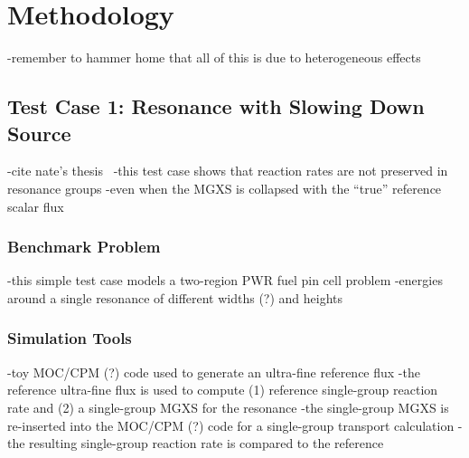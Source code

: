 \section{Methodology}
\label{sec:methodology}

-remember to hammer home that all of this is due to heterogeneous effects


\subsection{Test Case 1: Resonance with Slowing Down Source}
\label{subsec:test-case1}

-cite nate's thesis~\cite{gibson2016thesis}
-this test case shows that reaction rates are not preserved in resonance groups
  -even when the MGXS is collapsed with the ``true'' reference scalar flux

\subsubsection{Benchmark Problem}
\label{subsubsec:benchmark-case1}

-this simple test case models a two-region PWR fuel pin cell problem
-energies around a single resonance of different widths (?) and heights

\subsubsection{Simulation Tools}
\label{subsubsec:sim-tools-case1}

-toy MOC/CPM (?) code used to generate an ultra-fine reference flux
-the reference ultra-fine flux is used to compute (1) reference single-group reaction rate and (2) a single-group MGXS for the resonance
-the single-group MGXS is re-inserted into the MOC/CPM (?) code for a single-group transport calculation
-the resulting single-group reaction rate is compared to the reference



